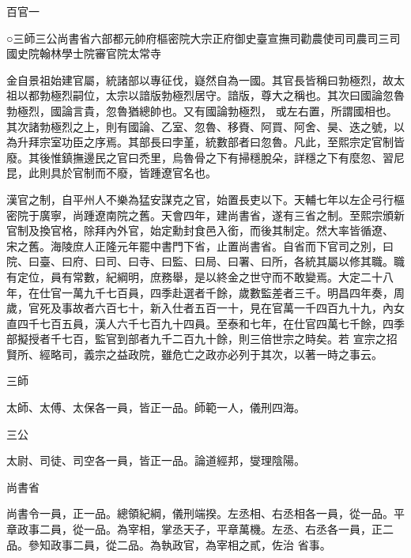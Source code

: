 
\begin{pinyinscope}

 百官一



 ○三師三公尚書省六部都元帥府樞密院大宗正府御史臺宣撫司勸農使司司農司三司國史院翰林學士院審官院太常寺



 金自景祖始建官屬，統諸部以專征伐，嶷然自為一國。其官長皆稱曰勃極烈，故太祖以都勃極烈嗣位，太宗以諳版勃極烈居守。諳版，尊大之稱也。其次曰國論忽魯勃極烈，國論言貴，忽魯猶總帥也。又有國論勃極烈，
 或左右置，所謂國相也。其次諸勃極烈之上，則有國論、乙室、忽魯、移賚、阿買、阿舍、昊、迭之號，以為升拜宗室功臣之序焉。其部長曰孛堇，統數部者曰忽魯。凡此，至熙宗定官制皆廢。其後惟鎮撫邊民之官曰禿里，烏魯骨之下有掃穩脫朵，詳穩之下有麼忽、習尼昆，此則具於官制而不廢，皆踵遼官名也。



 漢官之制，自平州人不樂為猛安謀克之官，始置長吏以下。天輔七年以左企弓行樞密院于廣寧，尚踵遼南院之舊。天會四年，建尚書省，遂有三省之制。至熙宗頒新官制及換官格，除拜內外官，始定勳封食邑入銜，而後其制定。然大率皆循遼、
 宋之舊。海陵庶人正隆元年罷中書門下省，止置尚書省。自省而下官司之別，曰院、曰臺、曰府、曰司、曰寺、曰監、曰局、曰署、曰所，各統其屬以修其職。職有定位，員有常數，紀綱明，庶務舉，是以終金之世守而不敢變焉。大定二十八年，在仕官一萬九千七百員，四季赴選者千餘，歲數監差者三千。明昌四年奏，周歲，官死及事故者六百七十，新入仕者五百一十，見在官萬一千四百九十九，內女直四千七百五員，漢人六千七百九十四員。至泰和七年，在仕官四萬七千餘，四季部擬授者千七百，監官到部者九千二百九十餘，則三倍世宗之時矣。若
 宣宗之招賢所、經略司，義宗之益政院，雖危亡之政亦必列于其次，以著一時之事云。



 三師



 太師、太傅、太保各一員，皆正一品。師範一人，儀刑四海。



 三公



 太尉、司徒、司空各一員，皆正一品。論道經邦，燮理陰陽。



 尚書省



 尚書令一員，正一品。總領紀綱，儀刑端揆。左丞相、右丞相各一員，從一品。平章政事二員，從一品。為宰相，掌丞天子，平章萬機。左丞、右丞各一員，正二品。參知政事二員，從二品。為執政官，為宰相之貳，佐治
 省事。




\end{pinyinscope}
